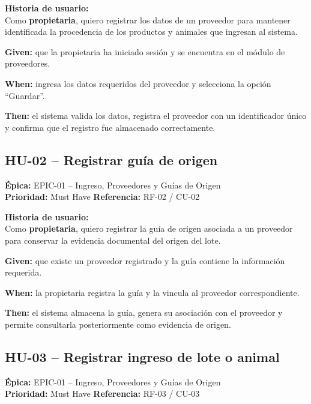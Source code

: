 \documentclass[11pt,a4paper]{article}
\begin{document}
\medskip
\textbf{Historia de usuario:}\\
Como \textbf{propietaria}, quiero registrar los datos de un proveedor para mantener
identificada la procedencia de los productos y animales que ingresan al sistema.

\begin{tcolorbox}[colback=lightblue,colframe=uteqblue,title=\textbf{BDD -- Criterio de aceptación}]
\textbf{Given:} que la propietaria ha iniciado sesión y se encuentra en el módulo de proveedores.

\medskip
\textbf{When:} ingresa los datos requeridos del proveedor y selecciona la opción ``Guardar''.

\medskip
\textbf{Then:} el sistema valida los datos, registra el proveedor con un identificador único
y confirma que el registro fue almacenado correctamente.
\end{tcolorbox}

\subsection{HU-02 -- Registrar guía de origen}
\textbf{Épica:} EPIC-01 -- Ingreso, Proveedores y Guías de Origen\\
\textbf{Prioridad:} Must Have \quad \textbf{Referencia:} RF-02 / CU-02

\medskip
\textbf{Historia de usuario:}\\
Como \textbf{propietaria}, quiero registrar la guía de origen asociada a un proveedor
para conservar la evidencia documental del origen del lote.

\begin{tcolorbox}[colback=lightblue,colframe=uteqblue,title=\textbf{BDD -- Criterio de aceptación}]
\textbf{Given:} que existe un proveedor registrado y la guía contiene la información requerida.

\medskip
\textbf{When:} la propietaria registra la guía y la vincula al proveedor correspondiente.

\medskip
\textbf{Then:} el sistema almacena la guía, genera su asociación con el proveedor y permite
consultarla posteriormente como evidencia de origen.
\end{tcolorbox}

\subsection{HU-03 -- Registrar ingreso de lote o animal}
\textbf{Épica:} EPIC-01 -- Ingreso, Proveedores y Guías de Origen\\
\textbf{Prioridad:} Must Have \quad \textbf{Referencia:} RF-03 / CU-03
\end{document}
